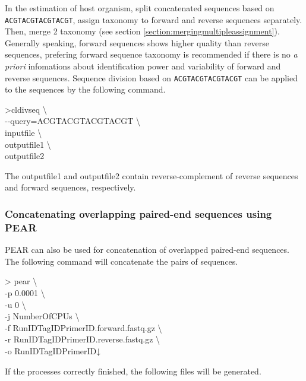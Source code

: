 \documentclass[titlepage,10pt,a4paper,english]{jsbook}
\newenvironment{cmd}{\begin{oframed}\raggedright\ttfamily\footnotesize\setlength{\baselineskip}{1.4em}}{\end{oframed}\vspace{-1em}}
\begin{document}
In the estimation of host organism, split concatenated sequences based on \texttt{ACGTACGTACGTACGT}, assign taxonomy to forward and reverse sequences separately.
Then, merge 2 taxonomy (see section \ref{section:mergingmultipleassignment}).
Generally speaking, forward sequences shows higher quality than reverse sequences, prefering forward sequence taxonomy is recommended if there is no \textit{a priori} infomations about identification power and variability of forward and reverse sequences.
Sequence division based on \texttt{ACGTACGTACGTACGT} can be applied to the sequences by the following command.

\begin{cmd}
{\textgreater}cldivseq {\textbackslash}\\
{-}{-}query=ACGTACGTACGTACGT {\textbackslash}\\
inputfile {\textbackslash}\\
outputfile1 {\textbackslash}\\
outputfile2
\end{cmd}

The outputfile1 and outputfile2 contain reverse-complement of reverse sequences and forward sequences, respectively.

\subsubsection{Concatenating overlapping paired-end sequences using PEAR}

PEAR \citep{Zhang2014} can also be used for concatenation of overlapped paired-end sequences.
The following command will concatenate the pairs of sequences.

\begin{cmd}
{\textgreater} pear {\textbackslash}\\
-p 0.0001 {\textbackslash}\\
-u 0 {\textbackslash}\\
-j NumberOfCPUs {\textbackslash}\\
-f RunID{\textunderscore}{\textunderscore}TagID{\textunderscore}{\textunderscore}PrimerID.forward.fastq.gz {\textbackslash}\\
-r RunID{\textunderscore}{\textunderscore}TagID{\textunderscore}{\textunderscore}PrimerID.reverse.fastq.gz {\textbackslash}\\
-o RunID{\textunderscore}{\textunderscore}TagID{\textunderscore}{\textunderscore}PrimerID↓
\end{cmd}

If the processes correctly finished, the following files will be generated.
\end{document}
